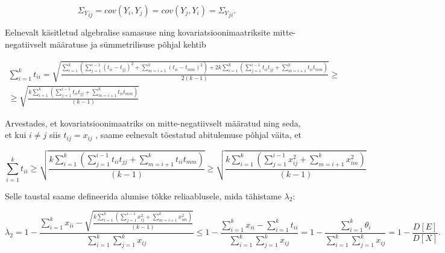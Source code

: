 \documentclass[a4paper,12pt,oneside]{article}
\numberwithin{equation}{section}
\theoremstyle{definition}
\begin{document}
\begin{equation*}
{\Sigma_Y}_{ij} = cov(Y_i,Y_j) = cov(Y_j,Y_i) = {\Sigma_Y}_{ji} \text{.}
\end{equation*} 

Eelnevalt käsitletud algebralise samasuse ning kovariatsioonimaatriksite mitte-negatiivselt määratuse ja sümmetrilisuse põhjal kehtib

\small
\begin{gather*}
\sum \limits_{i=1}^k t_{ii} = \sqrt{\frac{\sum \limits_{i=1}^k  \left( \sum \limits_{j=1}^{i-1} (t_{ii} - t_{jj})^2 + \sum \limits_{m=i+1}^k ({t_{ii}} - {t_{mm}})^2 \right) +  2 k \sum \limits_{i=1}^k  \left( \sum \limits_{j=1}^{i-1} t_{ii} t_{jj} + \sum \limits_{m=i+1}^k {t_{ii}}{t_{mm}} \right)}{2 \left( k -1 \right)}} \geq \\ 
\geq  \sqrt{\frac{ k \sum \limits_{i=1}^k  \left( \sum \limits_{j=1}^{i-1} t_{ii} t_{jj} + \sum \limits_{m=i+1}^k {t_{ii}}{t_{mm}} \right)}{\left( k -1 \right)}}
\end{gather*}
\normalsize

Arvestades, et kovariatsioonimaatriks on mitte-negatiivselt määratud ning seda, et kui $i \neq j$ siis $t_{ij} = x_{ij}$ , saame eelnevalt tõestatud abitulemuse põhjal väita, et

\begin{equation*}
\sum \limits_{i=1}^k t_{ii}  \geq \sqrt{\frac{ k \sum \limits_{i=1}^k  \left( \sum \limits_{j=1}^{i-1} t_{ii} t_{jj} + \sum \limits_{m=i+1}^k {t_{ii}}{t_{mm}} \right)}{\left( k -1 \right)}} \geq \sqrt{\frac{ k \sum \limits_{i=1}^k  \left( \sum \limits_{j=1}^{i-1} x_{ij}^2 + \sum \limits_{m=i+1}^k {x_{im}^2} \right)}{\left( k -1 \right)}}
\end{equation*} 

Selle taustal saame defineerida alumise tõkke reliaablusele, mida tähistame $\lambda_2$:

\small
\begin{equation*}
\lambda_2 = 1 - \frac{\sum \limits_{i=1}^k x_{ii} - \sqrt{\frac{ k \sum \limits_{i=1}^k  \left( \sum \limits_{j=1}^{i-1} x_{ij}^2 + \sum \limits_{m=i+1}^k {x_{im}^2} \right)}{\left( k -1 \right)}}}{\sum \limits_{i=1}^k \sum \limits_{j=1}^k x_{ij}} \leq 1 - \frac{\sum \limits_{i=1}^k x_{ii}- \sum \limits_{i=1}^k t_{ii}}{\sum \limits_{i=1}^k \sum \limits_{j=1}^k x_{ij}} =   1 - \frac{\sum \limits_{i=1}^k \theta_i}{\sum \limits_{i=1}^k \sum \limits_{j=1}^k x_{ij}} =  1 - \frac{D \left[ E \right]}{D \left[ X \right]} \text{.}
\end{equation*}
\normalsize
\end{document}
